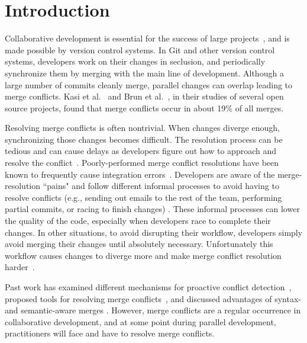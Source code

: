 

\section{Introduction}\label{introduction}

Collaborative development is essential for the success of large projects~\cite{hattori2010syde}, and is made possible by version control systems. 
In Git and other version control systems, developers work on their changes in seclusion, and periodically synchronize them by merging with the main line of development. 
Although a large number of commits cleanly merge, parallel changes can overlap leading to merge conflicts. Kasi et al.~\cite{cassandra} and Brun et al.~\cite{Brun2011}, in their studies of several open source projects, found that merge conflicts occur in about 19\% of all merges.

Resolving merge conflicts is often nontrivial. 
When changes diverge enough, synchronizing those changes becomes difficult. 
The resolution process can be tedious and can cause delays as developers figure out how to approach and resolve the conflict~\cite{cassandra}. 
Poorly-performed merge conflict resolutions have been known to frequently cause integration errors~\cite{bird-branches-conflict}. 
Developers are aware of the merge-resolution ``pains" and follow different informal processes to avoid having to resolve conflicts (e.g., sending out emails to the rest of the team, performing partial commits, or racing to finish changes) \cite{deSouza2003breaking}\cite{cataldo2008distributed_dev}.
These informal processes can lower the quality of the code, especially when developers race to complete their changes. 
In other situations, to avoid disrupting their workflow, developers simply avoid merging their changes until absolutely necessary.
Unfortunately this workflow causes changes to diverge more and make merge conflict resolution harder~\cite{Brun2011}. 


Past work has examined different mechanisms for proactive conflict detection~\cite{Brun2011}\cite{palantir}\cite{Guimaraes}, proposed tools for resolving merge conflicts~\cite{nishimura}\cite{mens2002state}, and discussed advantages of syntax- and semantic-aware merges \cite{danny_refactorings}\cite{hunt2002extensible}. 
However, merge conflicts are a regular occurrence in collaborative development, and at some point during parallel development, practitioners will face and have to resolve merge conflicts.

